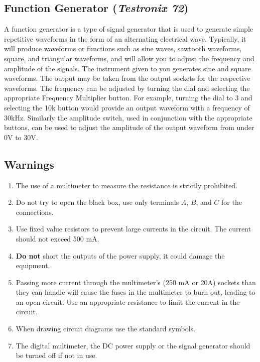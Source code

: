 \subsection*{Function Generator (\textit{Testronix 72})}

A function generator is a type of signal generator that is used to generate simple repetitive waveforms in the form of an alternating electrical wave. Typically, it will produce waveforms or functions such as sine waves, sawtooth waveforms, square, and triangular waveforms, and will allow you to adjust the frequency and amplitude of  the signals. The instrument given to you generates sine and square waveforms. The output may be taken from the output sockets for the respective waveforms. The frequency can be adjusted by turning the dial and selecting the appropriate Frequency Multiplier button. For example, turning the dial to 3 and selecting the 10k button would provide an output waveform with a frequency of 30kHz. Similarly the amplitude switch, used in conjunction with the appropriate buttons, can be used to adjust the amplitude of the output waveform from under 0V to 30V.


\subsection*{Warnings}

\begin{enumerate}
\item The use of a multimeter to measure the resistance is strictly prohibited.
\item Do not try to open the black box, use only terminals $A$, $B$, and $C$ for the connections.
\item Use fixed value resistors to prevent large currents in the circuit. The current should not exceed 500 mA.
\item \textbf{Do not} short the outputs of the power supply, it could damage the equipment.
\item Passing more current through the multimeter's (250 mA or 20A) sockets than they can handle will cause the fuses in the multimeter to burn out, leading to an open circuit. Use an appropriate resistance to limit the current in the circuit.
\item When drawing circuit diagrams use the standard symbols.
\item The digital multimeter, the DC power supply or the signal generator should be turned off if not in use.

\end{enumerate}



